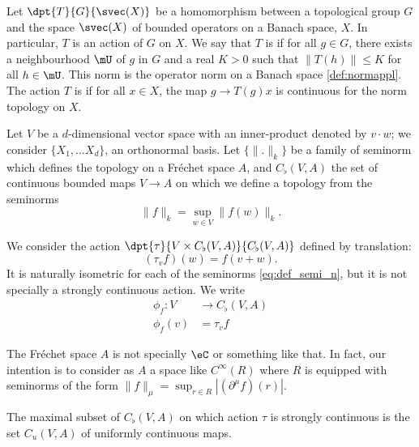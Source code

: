 Let $\dpt{T}{G}{\svec(X)}$ be a homomorphism between a topological group $G$ and the space $\svec(X)$ of bounded operators on a Banach space, $X$. In particular, $T$ is an action of $G$ on $X$. We say that $T$ is  if for all $g\in G$, there exists a neighbourhood $\mU$ of $g$ in $G$ and a real $K>0$ such that $\| T(h) \|\leq K$ for all $h\in\mU$. This norm is the operator norm on a Banach space \ref{def:normappl}. The action $T$ is  if for all $x\in X$, the map $g\to T(g)x$ is continuous for the norm topology on $X$.

Let $V$ be a $d$-dimensional vector space with an inner-product denoted by $v\cdot w$; we consider $\{ X_1,\ldots X_d \}$, an orthonormal basis. Let $\{\| . \|_k\}$ be a family of seminorm which defines the topology on a Fréchet space $A$, and $C_{\flat}(V,A)$  the set of continuous bounded maps $V\to A$ on which we define a topology from the seminorms
\begin{equation} \label{eq:def_semi_n}
  \| f \|_k=\sup_{w\in V}\| f(w) \|_k.
\end{equation}

We consider the action $\dpt{\tau}{V\times C_{\flat}(V,A)}{C_{\flat}(V,A)}$ defined by translation:
\begin{equation} \label{eq:def_act_tau}
(\tau_vf)(w)=f(v+w).
\end{equation}
It is naturally isometric for each of the seminorms \eqref{eq:def_semi_n}, but it is not specially a strongly continuous action. We write 
\begin{equation}
	\begin{aligned}
		\phi_f\colon V&\to C_{\flat}(V,A) \\
		\phi_f(v)&=\tau_vf 
	\end{aligned}
\end{equation}

\begin{remark}
The Fréchet space $A$ is not specially $\eC$ or something like that. In fact, our intention is to consider as $A$ a space like $ C^{\infty}(R)$ where $R$ is equipped with seminorms of the form $\| f \|_{\mu}=\sup_{r\in R}| (\partial^{\mu}f)(r) |$.
\end{remark}

\begin{proposition}
The maximal subset of $C_{\flat}(V,A)$ on which action $\tau$ is strongly continuous is the set $C_u(V,A)$ of uniformly continuous maps.
\end{proposition}

